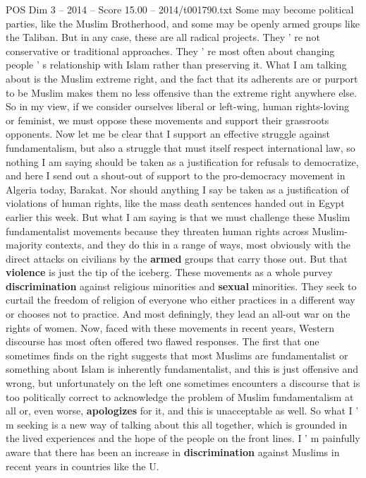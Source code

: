 \begin{textsample}{POS Dim 3 – 2014 – Score 15.00 – 2014/t001790.txt}
Some may become political parties, like the Muslim Brotherhood, and some may be openly armed groups like the Taliban.
But in any case, these are all radical projects.
They ' re not conservative or traditional approaches.
They ' re most often about changing people ' s relationship with Islam rather than preserving it.
What I am talking about is the Muslim extreme right, and the fact that its adherents are or purport to be Muslim makes them no less offensive than the extreme right anywhere else.
So in my view, if we consider ourselves liberal or left-wing, human rights-loving or feminist, we must oppose these movements and support their grassroots opponents.
Now let me be clear that I support an effective struggle against fundamentalism, but also a struggle that must itself respect international law, so nothing I am saying should be taken as a justification for refusals to democratize, and here I send out a shout-out of support to the pro-democracy movement in Algeria today, Barakat.
Nor should anything I say be taken as a justification of violations of human rights, like the mass death sentences handed out in Egypt earlier this week.
But what I am saying is that we must challenge these Muslim fundamentalist movements because they threaten human rights across Muslim- majority contexts, and they do this in a range of ways, most obviously with the direct attacks on civilians by the \textbf{armed} groups that carry those out.
But that \textbf{violence} is just the tip of the iceberg.
These movements as a whole purvey \textbf{discrimination} against religious minorities and \textbf{sexual} minorities.
They seek to curtail the freedom of religion of everyone who either practices in a different way or chooses not to practice.
And most definingly, they lead an all-out war on the rights of women.
Now, faced with these movements in recent years, Western discourse has most often offered two flawed responses.
The first that one sometimes finds on the right suggests that most Muslims are fundamentalist or something about Islam is inherently fundamentalist, and this is just offensive and wrong, but unfortunately on the left one sometimes encounters a discourse that is too politically correct to acknowledge the problem of Muslim fundamentalism at all or, even worse, \textbf{apologizes} for it, and this is unacceptable as well.
So what I ' m seeking is a new way of talking about this all together, which is grounded in the lived experiences and the hope of the people on the front lines.
I ' m painfully aware that there has been an increase in \textbf{discrimination} against Muslims in recent years in countries like the U.

\end{textsample}
